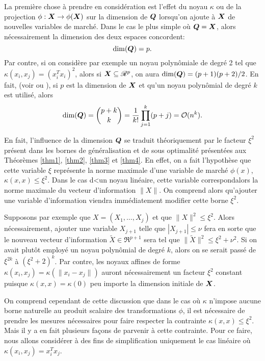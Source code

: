 La première chose à prendre en considération est l'effet du noyau $\kappa$ ou de la projection
$\phi:\bm{X}\to\phi(\bm{X})$ sur la dimension de $\bm Q$ lorsqu'on ajoute à $\bm{X}$ de nouvelles variables de
marché. Dans le cas le plus simple où $\bm Q = \bm{X}$, alors nécessairement la dimension des
deux espaces concordent:
\begin{equation}
  \operatorname{dim}(\bm Q) = p.
\end{equation}
Par contre, si on considère par exemple un noyau polynômiale de degré 2 tel que
$\kappa(x_i,x_j) = (x_i^Tx_i)^2$, alors si $\bm{X} \subseteq \mathscr{R}^p$, on aura
$\operatorname{dim}(\bm Q) = (p+1)(p+2)/2$. En fait, (voir \cite{mohri2012foundations} ou
\cite{bishop2006pattern}), si $p$ est la dimension de $\bm{X}$ et qu'un noyau polynômial de
degré $k$ est utilisé, alors
\begin{equation}
  \operatorname{dim}(\bm Q) = \binom{p+k}{k} = \frac{1}{k!}\prod_{j=1}^k(p+j) = \mathcal O(n^k).
\end{equation}

En fait, l'influence de la dimension $\bm Q$ se traduit théoriquement par le facteur $\xi^2$
présent dans les bornes de généralisation et de sous optimalité présentées aux Théorèmes
\ref{thm1}, \ref{thm2}, \ref{thm3} et \ref{thm4}. En effet, on a fait l'hypothèse que
cette variable $\xi$ représente la norme maximale d'une variable de marché $\phi(x)$, \ie
$\kappa(x,x) \leq \xi^2$. Dans le cas d<un noyau linéaire, cette variable correspondalors la norme
maximale du vecteur d'information $\|X\|$. On comprend alors qu'ajouter une variable
d'information viendra immédiatement modifier cette borne $\xi^2$.

Supposons par exemple que $X = (X_1,\ldots,X_j)$ et que $\|X\|^2\leq\xi^2$. Alors nécessairement,
ajouter une variable $X_{j+1}$ telle que $|X_{j+1}|\leq\nu$ fera en sorte que le nouveau
vecteur d'information $\tilde X \in \Re^{p+1}$ sera tel que $\|\tilde X\|^2 \leq \xi^2 + \nu^2$. 
Si on avait plutôt employé un noyau polynômial de degré $k$, alors on se serait passé de
$\xi^{2k}$ à $(\xi^2+2)^k$. Par contre, les noyaux affines de forme $\kappa(x_i,x_j) = \kappa(\|x_i -
x_j\|)$ auront nécessairement un facteur $\xi^2$ constant puisque $\kappa(x,x) = \kappa(0)$ peu
importe la dimension initiale de $\bm{X}$.

On comprend cependant de cette discussion que dans le cas où $\kappa$ n'impose aucune borne
naturelle au produit scalaire des transformations $\phi$, il est nécessaire de prendre les
mesures nécessaires pour faire respecter la contrainte $\kappa(x,x)\leq\xi^2$. Mais il y a en fait
plusieurs façons de parvenir à cette contrainte. Pour ce faire, nous allons considérer à
des fins de simplification uniquement le cas linéaire où $\kappa(x_i,x_j) = x_i^Tx_j$.


